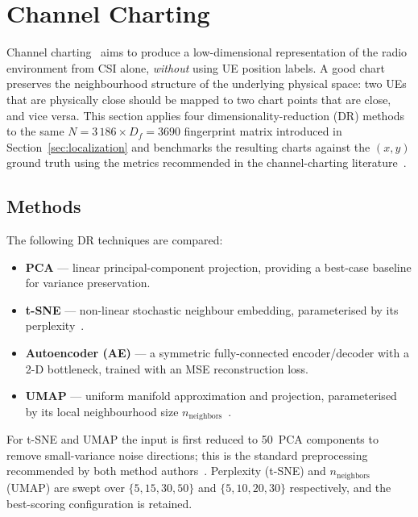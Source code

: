 \section{Channel Charting}
\label{sec:channel_charting}

Channel charting~\cite{studer2018channel_charting} aims to produce a
low-dimensional representation of the radio environment from CSI alone,
\emph{without} using UE position labels.
A good chart preserves the neighbourhood structure of the underlying
physical space: two UEs that are physically close should be mapped to
two chart points that are close, and vice versa.
This section applies four dimensionality-reduction (DR) methods to the
same $N=3\,186 \times D_f = 3690$ fingerprint matrix introduced in
Section~\ref{sec:localization} and benchmarks the resulting charts against
the $(x,y)$ ground truth using the metrics recommended in the channel-charting literature~\cite{studer2018channel_charting,lei2019siamese_cc}.

\subsection{Methods}

The following DR techniques are compared:
\begin{itemize}
  \item \textbf{PCA} --- linear principal-component projection, providing
        a best-case baseline for variance preservation.
  \item \textbf{t-SNE} --- non-linear stochastic neighbour embedding,
        parameterised by its perplexity~\cite{vandermaaten2008tsne}.
  \item \textbf{Autoencoder (AE)} --- a symmetric fully-connected
        encoder/decoder with a 2-D bottleneck, trained with an MSE
        reconstruction loss.
  \item \textbf{UMAP} --- uniform manifold approximation and projection,
        parameterised by its local neighbourhood size
        $n_{\mathrm{neighbors}}$~\cite{mcinnes2018umap}.
\end{itemize}
For t-SNE and UMAP the input is first reduced to 50~PCA components to
remove small-variance noise directions; this is the standard preprocessing
recommended by both method
authors~\cite{vandermaaten2008tsne,mcinnes2018umap}.
Perplexity (t-SNE) and $n_{\mathrm{neighbors}}$ (UMAP) are swept over
$\{5,15,30,50\}$ and $\{5,10,20,30\}$ respectively, and the best-scoring
configuration is retained.


